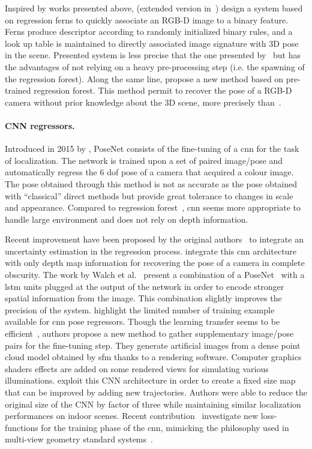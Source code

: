 Inspired by works presented above, \citet{Glocker2013} (extended version in~\citep{Glocker2015}) design a system based on regression ferns to quickly associate an RGB-D image to a binary feature. Ferns produce descriptor according to randomly initialized binary rules, and a look up table is maintained to directly associated image signature with 3D pose in the scene. Presented system is less precise that the one presented by~\citet{Shotton2013} but has the advantages of not relying on a heavy pre-processing step (i.e. the spawning of the regression forest). Along the same line, \citet{Cavallari} propose a new method based on pre-trained regression forest. This method permit to recover the pose of a RGB-D camera without prior knowledge about the 3D scene, more precisely than~\citet{Glocker2013,Glocker2015}.


\paragraph{CNN regressors.}
\label{para:cnn_regressor}
Introduced in 2015 by \citet{Kendall2015}, PoseNet consists of the fine-tuning of a \ac{cnn} for the task of localization. The network is trained upon a set of paired image/pose and automatically regress the 6 \ac{dof} pose of a camera that acquired a colour image. The pose obtained through this method is not as accurate as the pose obtained with ``classical'' direct methods \citep{Feng2016a,Sattler2016a} but provide great tolerance to changes in scale and appearance. Compared to regression forest~\citep{Valentin2015}, \ac{cnn} seems more appropriate to handle large environment and does not rely on depth information.

Recent improvement have been proposed by the original authors~\citep{Kendall2016} to integrate an uncertainty estimation in the regression process. \citet{Liu2016} integrate this \ac{cnn} architecture with only depth map information for recovering the pose of a camera in complete obscurity. The work by Walch et al.~\citep{Walch2016mastersThesis,Walch2016a} present a combination of a PoseNet~\citep{Kendall2015} with a \ac{lstm} units plugged at the output of the network in order to encode stronger spatial information from the image. This combination slightly improves the precision of the system. \citet{Jia2016} highlight the limited number of training example available for \ac{cnn} pose regressors. Though the learning transfer seems to be efficient~\citep{Kendall2015}, authors propose a new method to gather supplementary image/pose pairs for the fine-tuning step. They generate artificial images from a dense point cloud model obtained by \ac{sfm} thanks to a rendering software. Computer graphics shaders effects are added on some rendered views for simulating various illuminations. \citet{Contreras2017} exploit this CNN architecture in order to create a fixed size map that can be improved by adding new trajectories. Authors were able to reduce the original size of the CNN by factor of three while maintaining similar localization performances on indoor scenes. Recent contribution~\citep{Kendall2017} investigate new loss-functions for the training phase of the \ac{cnn}, mimicking the philosophy used in multi-view geometry standard systems~\citep{Hartley2003}.

